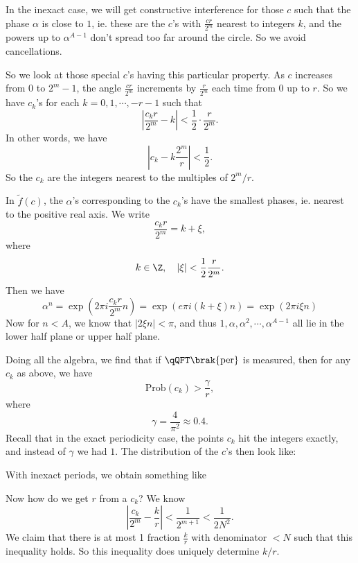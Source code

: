 \documentclass[a4paper]{article}
\begin{document}
In the inexact case, we will get constructive interference for those $c$ such that the phase $\alpha$ is close to $1$, ie. these are the $c$'s with $\frac{cr}{2^m}$ nearest to integers $k$, and the powers up to $\alpha^{A - 1}$ don't spread too far around the circle. So we avoid cancellations.

So we look at those special $c$'s having this particular property. As $c$ increases from $0$ to $2^m - 1$, the angle $\frac{cr}{2^m}$ increments by $\frac{r}{2^m}$ each time from $0$ up to $r$. So we have $c_k$'s for each $k = 0, 1, \cdots, -r - 1$ such that
\[
  \left|\frac{c_k r}{2^m} - k\right| < \frac{1}{2} \cdot \frac{r}{2^m}.
\]
In other words, we have
\[
  \left|c_k - k\frac{2^m}{r}\right| < \frac{1}{2}.
\]
So the $c_k$ are the integers nearest to the multiples of $2^m/r$.

In $\tilde{f}(c)$, the $\alpha$'s corresponding to the $c_k$'s have the smallest phases, ie. nearest to the positive real axis. We write
\[
  \frac{c_k r}{2^m} = k + \xi,
\]
where
\[
  k \in \Z,\quad |\xi| < \frac{1}{2} \frac{r}{2^m}.
\]
Then we have
\[
  \alpha^n = \exp\left(2\pi i \frac{c_k r}{2^m}n\right) = \exp\left(e\pi i(k + \xi)n\right) = \exp(2 \pi i \xi n)
\]
Now for $n < A$, we know that $|2 \xi n| < \pi$, and thus $1, \alpha, \alpha^2, \cdots, \alpha^{A - 1}$ all lie in the lower half plane or upper half plane.

Doing all the algebra, we find that if $\qQFT\brak{\mathrm{per}}$ is measured, then for any $c_k$ as above, we have
\[
  \mathrm{Prob}(c_k) > \frac{\gamma}{r},
\]
where
\[
  \gamma = \frac{4}{\pi^2} \approx 0.4.
\]
Recall that in the exact periodicity case, the points $c_k$ hit the integers exactly, and instead of $\gamma$ we had $1$. The distribution of the $c$'s then look like:
\begin{center}
\end{center}
With inexact periods, we obtain something like
\begin{center}
\end{center}
Now how do we get $r$ from a $c_k$? We know
\[
  \left| \frac{c_k}{2^m} - \frac{k}{r}\right| < \frac{1}{2^{m + 1}} < \frac{1}{2N^2}.
\]
We claim that there is at most 1 fraction $\frac{k}{r}$ with denominator $< N$ such that this inequality holds. So this inequality does uniquely determine $k/r$.
\end{document}

